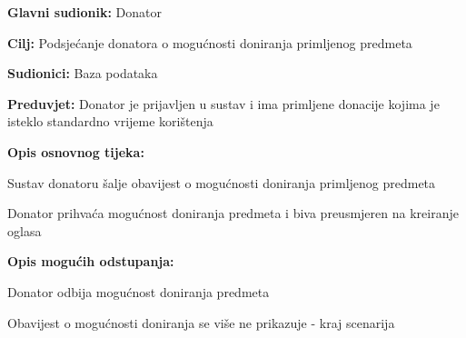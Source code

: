 					\noindent {}
					\begin{packed_item}
	
						\item \textbf{Glavni sudionik: }Donator
						\item  \textbf{Cilj:} Podsjećanje donatora o mogućnosti doniranja primljenog predmeta
						\item  \textbf{Sudionici:} Baza podataka
						\item  \textbf{Preduvjet:} Donator je prijavljen u sustav i ima primljene donacije kojima je isteklo standardno vrijeme korištenja

						\item  \textbf{Opis osnovnog tijeka:}
						
						\item[] \begin{packed_enum}
							\item Sustav donatoru šalje obavijest o mogućnosti doniranja primljenog predmeta
							\item Donator prihvaća mogućnost doniranja predmeta i biva preusmjeren na kreiranje oglasa
						\end{packed_enum}

						\item  \textbf{Opis mogućih odstupanja:}

						\item[] \begin{packed_item}
							\item[2.a] Donator odbija mogućnost doniranja predmeta
							\item[] \begin{packed_enum}
								
								\item Obavijest o mogućnosti doniranja se više ne prikazuje - kraj scenarija
							
							\end{packed_enum}	
						\end{packed_item}
					\end{packed_item}

					\eject

